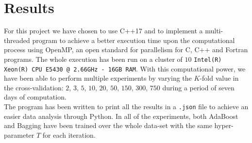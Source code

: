 
\chapter{Results}
For this project we have chosen to use C++17 and to implement a multi-threaded program to achieve a better execution time upon the computational process using OpenMP, an open standard for parallelism for C, C++ and Fortran programs. The whole execution has been run on a cluster of $10$ \texttt{Intel(R) Xeon(R) CPU E5430 @ 2.66GHz - 16GB RAM}. With this computational power, we have been able to perform multiple experiments by varying the $K$-fold value in the cross-validation: $2$, $3$, $5$, $10$, $20$, $50$, $150$, $300$, $750$ during a period of seven days of computation.\\
The program has been written to print all the results in a \texttt{.json} file to achieve an easier data analysis through Python. In all of the experiments, both AdaBoost and Bagging have been trained over the whole data-set with the same hyper-parameter $T$ for each iteration.\\
